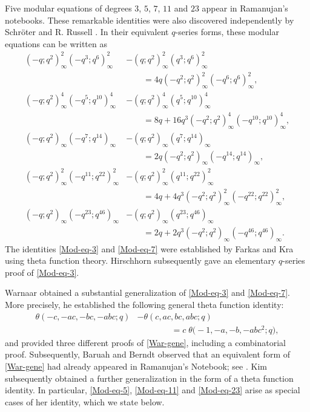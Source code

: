 \documentclass[12pt,reqno]{amsart}
\numberwithin{equation}{section}
\theoremstyle{plain}
\theoremstyle{definition}
\begin{document}
Five modular equations of degrees $3$, $5$, $7$, $11$ and $23$ appear in Ramanujan's
notebooks. These remarkable identities were also discovered independently by
Schr\"{o}ter \cite{Rus1887} and R. Russell \cite{Rus1890, Sch1890}. In their equivalent
$q$-series forms, these modular equations can be written as
\begin{align}
(-q;q^2)_\infty^2(-q^3;q^6)_\infty^2 &-(q;q^2)_\infty^2(q^3;q^6)_\infty^2\nonumber\\
 &\qquad=4q(-q^2;q^2)_\infty^2(-q^6;q^6)_\infty^2,\label{Mod-eq-3}\\
(-q;q^2)_\infty^4(-q^5;q^{10})_\infty^4 &-(q;q^2)_\infty^4(q^5;q^{10})_\infty^4
\nonumber\\
 &\qquad=8q+16q^3(-q^2;q^2)_\infty^4(-q^{10};q^{10})_\infty^4,\label{Mod-eq-5}\\
(-q;q^2)_\infty(-q^7;q^{14})_\infty &-(q;q^2)_\infty(q^7;q^{14})_\infty\nonumber\\
 &\qquad=2q(-q^2;q^2)_\infty(-q^{14};q^{14})_\infty,\label{Mod-eq-7}\\
(-q;q^2)_\infty^2(-q^{11};q^{22})_\infty^2 &-(q;q^2)_\infty^2(q^{11};q^{22})_\infty^2
\nonumber\\
 &\qquad=4q+4q^3(-q^2;q^2)_\infty^2(-q^{22};q^{22})_\infty^2,\label{Mod-eq-11}\\
(-q;q^2)_\infty(-q^{23};q^{46})_\infty &-(q;q^2)_\infty(q^{23};q^{46})_\infty\nonumber\\
 &\qquad=2q+2q^3(-q^2;q^2)_\infty(-q^{46};q^{46})_\infty.\label{Mod-eq-23}
\end{align}
The identities \eqref{Mod-eq-3} and \eqref{Mod-eq-7} were established by Farkas and Kra
\cite{FK2000, FK2001} using theta function theory. Hirschhorn \cite{Hir2006}
subsequently gave an elementary $q$-series proof of \eqref{Mod-eq-3}.

Warnaar \cite{War2005} obtained a substantial generalization of \eqref{Mod-eq-3} and
\eqref{Mod-eq-7}. More precisely, he established the following general theta function
identity:
\begin{align}
\theta(-c,-ac,-bc,-abc;q) &-\theta(c,ac,bc,abc;q)\nonumber\\
 &\qquad\qquad=c\!\;\theta\big({-}1,-a,-b,-abc^2;q\big),\label{War-gene}
\end{align}
and provided three different proofs of \eqref{War-gene}, including a combinatorial
proof. Subsequently, Baruah and Berndt \cite{BB2007} observed that an equivalent form
of \eqref{War-gene} had already appeared in Ramanujan's Notebook; see
\cite[p.~47, Corollary]{Ber1991}. Kim \cite{Kim2021} subsequently obtained a further
generalization in the form of a theta function identity. In particular,
\eqref{Mod-eq-5}, \eqref{Mod-eq-11} and \eqref{Mod-eq-23} arise as special cases of her
identity, which we state below.
\end{document}
